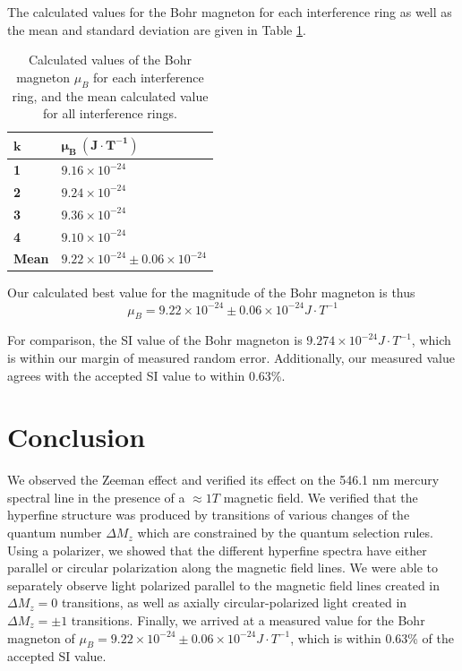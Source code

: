 \documentclass[twocolumn]{article}
\begin{document}
		The calculated values for the Bohr magneton for each interference ring as well as the mean and standard deviation are given in Table \ref{tab:BohrCalcs}.
		
		\begin{table}[]
			\centering
			\begin{tabular}{l|l}
				$\mathbf{k}$    & $\mathbf{\boldsymbol{\mu}_B \ (J\cdot T^{-1})}$ \\ \hline
				\textbf{1}    & $9.16\times10^{-24}$   \\
				\textbf{2}    & $9.24\times10^{-24}$   \\
				\textbf{3}    & $9.36\times10^{-24}$   \\
				\textbf{4}    & $9.10\times10^{-24}$   \\ \hline
				\textbf{Mean} & $9.22\times10^{-24}\pm0.06\times10^{-24}$  
			\end{tabular}
			\caption{Calculated values of the Bohr magneton $\mu_B$ for each interference ring, and the mean calculated value for all interference rings.}
			\label{tab:BohrCalcs}
		\end{table}
		
		Our calculated best value for the magnitude of the Bohr magneton is thus 
		\begin{equation}
			\mu_B = 9.22\times10^{-24}\pm 0.06\times10^{-24} J\cdot T^{-1}
		\end{equation}
		
		For comparison, the SI value of the Bohr magneton is $9.274\times10^{-24} J\cdot T^{-1}$\cite{_codata_????}, which is within our margin of measured random error.
		Additionally, our measured value agrees with the accepted SI value to within 0.63\%.
		

\section{Conclusion} \label{sec:Conclusion}
	We observed the Zeeman  effect and verified its effect on the 546.1 nm mercury spectral line in the presence of a $\approx1T$ magnetic field.
	We verified that the hyperfine structure was produced by transitions of various changes of the quantum number $\Delta M_z$ which are constrained by the quantum selection rules.
	Using a polarizer, we showed that the different hyperfine spectra have either parallel or circular polarization along the magnetic field lines.
	We were able to separately observe light polarized parallel to the magnetic field lines created in $\Delta M_z = 0$ transitions, as well as axially circular-polarized light created in $\Delta M_z = \pm1$ transitions.
	Finally, we arrived at a measured value for the Bohr magneton of $\mu_B = 9.22\times10^{-24}\pm 0.06\times10^{-24} J\cdot T^{-1}$, which is within 0.63\% of the accepted SI value.


\end{document}
